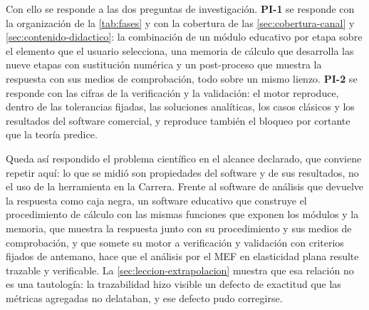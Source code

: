 Con ello se responde a las dos preguntas de investigación. \textbf{PI-1} se responde con la organización de la \autoref{tab:fases} y con la cobertura de las \autoref{sec:cobertura-canal} y \autoref{sec:contenido-didactico}: la combinación de un módulo educativo por etapa sobre el elemento que el usuario selecciona, una memoria de cálculo que desarrolla las nueve etapas con sustitución numérica y un post-proceso que muestra la respuesta con sus medios de comprobación, todo sobre un mismo lienzo. \textbf{PI-2} se responde con las cifras de la verificación y la validación: el motor reproduce, dentro de las tolerancias fijadas, las soluciones analíticas, los casos clásicos y los resultados del software comercial, y reproduce también el bloqueo por cortante que la teoría predice.

Queda así respondido el problema científico en el alcance declarado, que conviene repetir aquí: lo que se midió son propiedades del software y de sus resultados, no el uso de la herramienta en la Carrera. Frente al software de análisis que devuelve la respuesta como caja negra, un software educativo que construye el procedimiento de cálculo con las mismas funciones que exponen los módulos y la memoria, que muestra la respuesta junto con su procedimiento y sus medios de comprobación, y que somete su motor a verificación y validación con criterios fijados de antemano, hace que el análisis por el MEF en elasticidad plana resulte trazable y verificable. La \autoref{sec:leccion-extrapolacion} muestra que esa relación no es una tautología: la trazabilidad hizo visible un defecto de exactitud que las métricas agregadas no delataban, y ese defecto pudo corregirse.
